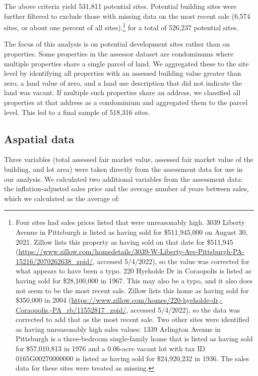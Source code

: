 \documentclass[
]{book}
\theoremstyle{definition}
\theoremstyle{definition}
\theoremstyle{definition}
\theoremstyle{definition}
\theoremstyle{remark}
\begin{document}
The above criteria yield 531,811 potential sites. Potential building sites were
further filtered to exclude those with missing data on the most recent sale
(6,574 sites, or about one percent of all sites).\footnote{Four sites had sales prices
  listed that were unreasonably high. 3039 Liberty Avenue in Pittsburgh is listed
  as having sold for \$511,945,000 on August 30, 2021. Zillow lists this property
  as having sold on that date for \$511,945
  (\url{https://www.zillow.com/homedetails/3039-W-Liberty-Ave-Pittsburgh-PA-15216/2070262638_zpid/}, accessed 5/4/2022),
  so the value was corrected for what appears to have been a typo. 220 Hyeholde Dr
  in Coraopolis is listed as having sold for \$28,100,000 in 1967. This may also
  be a typo, and it also does not seem to be the most recent sale. Zillow lists
  this home as having sold for \$350,000 in 2004
  (\url{https://www.zillow.com/homes/220-hyeholde-dr,-Coraopolis,-PA_rb/11552817_zpid/},
  accessed 5/4/2022), so the data was corrected to add that as the most recent sale.
  Two other sites were identified as having unreasonably high sales values: 1339
  Arlington Avenue in Pittsburgh is a three-bedroom single-family home that is
  listed as having sold for \$57,010,813 in 1976 and a 0.06-acre vacant lot with
  tax ID 0165G00270000000 is listed as having sold for \$24,920,232 in 1936. The
  sales data for these sites were treated as missing.} for a total of 526,237
potential sites.

The focus of this analysis is on potential development sites rather than on
properties. Some properties in the assessor dataset are condominums where
multiple properties share a single parcel of land. We aggregated these to the
site level by identifying all properties with an assessed building value
greater than zero, a land value of zero, and a land use description that did
not indicate the land was vacant. If multiple such properties share an address,
we classified all properties at that address as a condominium and aggregated
them to the parcel level. This led to a final sample of 518,316 sites.

\hypertarget{aspatial-data}{%
\subsection{Aspatial data}\label{aspatial-data}}

Three variables (total assessed fair market value, assessed fair market value of the building, and lot area) were taken directly from the assessment data for use in our analysis. We calculated two additional variables from the assessment data: the inflation-adjusted sales price and the average number of years between sales, which we calculated as the average of:
\end{document}

